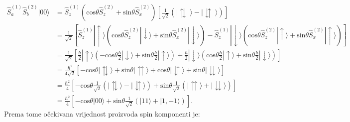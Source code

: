 \begin{equation}
    \begin{aligned}
        \hat{S}_a^{(1)}\hat{S}_b^{(2)} | 00 \rangle & = \hat{S}_z^{(1)}\left(\mathrm{cos}{\theta} \hat{S}_z^{(2)} + \mathrm{sin}{\theta} \hat{S}_x^{(2)}\right) \left[\frac{1}{\sqrt2}(| \updownarrows \; \rangle - | \downuparrows \; \rangle)\right]                                                                                                                                                                  \\[1ex]
                                        & = \frac{1}{\sqrt{2}} \left[ \hat{S}_z^{(1)}|\uparrow\rangle \left( \mathrm{cos}{\theta} \hat{S}_z^{(2)}|\downarrow\rangle + \mathrm{sin}{\theta} \hat{S}_x^{(2)}|\downarrow\rangle \right) - \hat{S}_z^{(1)}|\downarrow\rangle \left( \mathrm{cos}{\theta} \hat{S}_z^{(2)}|\uparrow\rangle + \mathrm{sin}{\theta} \hat{S}_x^{(2)}|\uparrow\rangle \right) \right]                                     \\[1ex]
                                        & = \frac{1}{\sqrt{2}} \left[ \frac{\hbar}{2}|\uparrow\rangle \left( -\mathrm{cos}{\theta}\frac{\hbar}{2}|\downarrow\rangle + \mathrm{sin}{\theta} \frac{\hbar}{2}|\uparrow\rangle \right) + \frac{\hbar}{2}|\downarrow\rangle \left( \mathrm{cos}{\theta} \frac{\hbar}{2}|\uparrow\rangle + \mathrm{sin}{\theta} \frac{\hbar}{2}|\downarrow\rangle \right) \right] \\[1ex]
                                        & = \frac{\hbar^2}{4\sqrt{2}} \left[ -\mathrm{cos}{\theta} |\updownarrows\rangle + \mathrm{sin}{\theta}|\upuparrows\rangle + \mathrm{cos}{\theta} |\downuparrows\rangle + \mathrm{sin}{\theta}|\downdownarrows\rangle \right]                                                                                                                                       \\[1ex]
                                        & = \frac{\hbar^2}{4} \left[ - \mathrm{cos}{\theta} \frac{1}{\sqrt{2}} \left( |\updownarrows\rangle -  |\downuparrows\rangle \right) + \mathrm{sin}{\theta} \frac{1}{\sqrt{2}} \left( |\upuparrows\rangle + |\downdownarrows\rangle \right) \right]                                                                                               \\[1ex]
                                        & = \frac{\hbar^2}{4} \left[ - \mathrm{cos}{\theta}|00\rangle + \mathrm{sin}{\theta} \frac{1}{\sqrt{2}} \left( | 11 \rangle + | 1, {-1} \rangle \right) \right].
    \end{aligned}
\end{equation}
Prema tome očekivana vrijednost proizvoda spin komponenti je:

